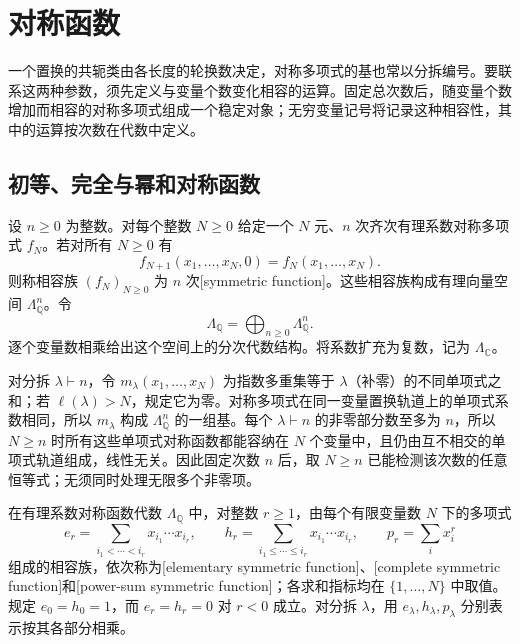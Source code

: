 \section{对称函数}
\label{b5:sec:0701}

一个置换的共轭类由各长度的轮换数决定，对称多项式的基也常以分拆编号。要联系这两种参数，须先定义与变量个数变化相容的运算。固定总次数后，随变量个数增加而相容的对称多项式组成一个稳定对象；无穷变量记号将记录这种相容性，其中的运算按次数在代数中定义。

\subsection{初等、完全与幂和对称函数}
\label{b5:subsec:0701:01}

\begin{definition}\label{b5:def:symmetric-function}
	设 \(n\ge0\) 为整数。对每个整数 \(N\ge0\) 给定一个 \(N\) 元、\(n\) 次齐次有理系数对称多项式 \(f_N\)。若对所有 \(N\ge0\) 有
	\[
		f_{N+1}(x_1,\ldots,x_N,0)=f_N(x_1,\ldots,x_N).
	\]
	则称相容族 \((f_N)_{N\ge0}\) 为 \(n\) 次[symmetric function]。这些相容族构成有理向量空间 \(\Lambda_{\mathbb Q}^n\)。令
	\[
		\Lambda_{\mathbb Q}=\bigoplus_{n\ge0}\Lambda_{\mathbb Q}^n.
	\]
	逐个变量数相乘给出这个空间上的分次代数结构。将系数扩充为复数，记为 \(\Lambda_{\mathbb C}\)。
\end{definition}

对分拆 \(\lambda\vdash n\)，令 \(m_\lambda(x_1,\ldots,x_N)\) 为指数多重集等于 \(\lambda\)（补零）的不同单项式之和；若 \(\ell(\lambda)>N\)，规定它为零。对称多项式在同一变量置换轨道上的单项式系数相同，所以 \(m_\lambda\) 构成 \(\Lambda_{\mathbb Q}^n\) 的一组基。每个 \(\lambda\vdash n\) 的非零部分数至多为 \(n\)，所以 \(N\ge n\) 时所有这些单项式对称函数都能容纳在 \(N\) 个变量中，且仍由互不相交的单项式轨道组成，线性无关。因此固定次数 \(n\) 后，取 \(N\ge n\) 已能检测该次数的任意恒等式；无须同时处理无限多个非零项。

\begin{definition}\label{b5:def:ehp-symmetric}
	在有理系数对称函数代数 \(\Lambda_{\mathbb Q}\) 中，对整数 \(r\ge1\)，由每个有限变量数 \(N\) 下的多项式
	\[
		e_r=\sum_{i_1<\cdots<i_r}x_{i_1}\cdots x_{i_r},\qquad h_r=\sum_{i_1\le\cdots\le i_r}x_{i_1}\cdots x_{i_r},\qquad p_r=\sum_i x_i^r
	\]
	组成的相容族，依次称为[elementary symmetric function]、[complete symmetric function]和[power-sum symmetric function]；各求和指标均在 \(\{1,\ldots,N\}\) 中取值。规定 \(e_0=h_0=1\)，而 \(e_r=h_r=0\) 对 \(r<0\) 成立。对分拆 \(\lambda\)，用 \(e_\lambda,h_\lambda,p_\lambda\) 分别表示按其各部分相乘。
\end{definition}

